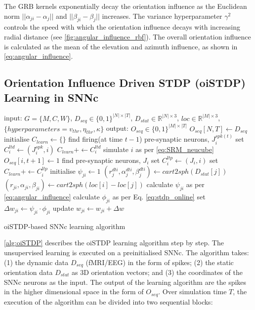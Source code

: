 The GRB kernels exponentially decay the orientation influence as the Euclidean norm $||\alpha_{ji}-\alpha_j||$ and $||\beta_{ji}-\beta_j||$ increases. The variance hyperparameter $\gamma^2$ controls the speed with which the orientation influence decays with increasing radial distance (see \figurename \ref{fig:angular_influence_rbf}). The overall orientation influence is calculated as the mean of the elevation and azimuth influence, as shown in \equationname \ref{eq:angular_influence}.  

\subsection{Orientation Influence Driven STDP (oiSTDP) Learning in SNNc}
\begin{algorithm}
	\begin{algorithmic}[1]
		\STATE input: $G=\{M,C,W\}$, $D_{seq}\in \{0, 1\}^{|N|\times |T|}$, $D_{stat}\in \mathbb{R}^{|N|\times 3}$, $loc \in \mathbb{R}^{|M|\times 3}$,$\{hyperparameters=v_{thr}, \eta_{thr}, \kappa\}$
		\STATE output: $O_{seq} \in \{0, 1\}^{|M|\times |T|}$
		\STATE $O_{seq}[N,T]\leftarrow D_{seq}$
			\STATE initialise $C_{learn}\leftarrow \{\}$
				\STATE find firing(at time $t-1$) pre-synaptic neurons, $J^{spk(t)}_i$
				\STATE set $C^{ltd}_i \leftarrow(J^{spk}_i, i)$
				\STATE $C_{learn}+\leftarrow C^{ltd}_i$
				\STATE simulate $i$ as per \equationname \ref{eq:SRM_neucube}
					\STATE $O_{seq}[i,t+1]\leftarrow 1$	
					\STATE find pre-synaptic neurons, $J_{i}$
					\STATE set $C_i^{ltp}\leftarrow(J_i,i)$
					\STATE set $C_{learn}+\leftarrow C^{ltp}_i$
				\ENDIF
		\ENDFOR
			\STATE initialise $\psi_{ji}\leftarrow 1$
				\STATE $(r_j^{dti}, \alpha_j^{dti},\beta_j^{dti})\leftarrow cart2sph(D_{stat}[j])$
				\STATE $(r_{ji},\alpha_{ji},\beta_{ji})\leftarrow cart2sph(loc[i]-loc[j])$
				\STATE calculate $\psi_{ji}$ as per \equationname \ref{eq:angular_influence}	
			\ENDIF
			\STATE calculate $\phi_{ji}$ as per Eq. \ref{eq:stdp_online}
			\STATE set $\Delta w_{ji}\leftarrow \psi_{ji}\cdot \phi_{ji}$
			\STATE update $w_{ji}\leftarrow w_{ji}+\Delta w$
		\ENDFOR
		\ENDFOR
		
	\end{algorithmic}
	\caption{oiSTDP-based SNNc learning algorithm}
	\label{alg:oiSTDP}
\end{algorithm}
\algorithmname \ref{alg:oiSTDP} describes the oiSTDP learning algorithm step by step. The unsupervised learning is executed on a preinitialised SNNc. The algorithm takes: (1) the dynamic data $D_{seq}$ (fMRI/EEG) in the form of spikes; (2) the static orientation data $D_{stat}$ as 3D orientation vectors; and (3) the coordinates of the SNNc neurons as the input. The output of the learning algorithm are the spikes in the higher dimensional space in the form of $O_{seq}$. Over simulation time $T$, the execution of the algorithm can be divided into two sequential blocks:
